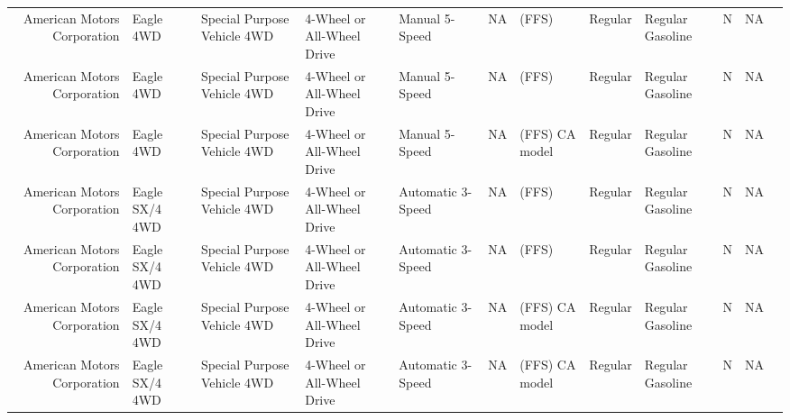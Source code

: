 \documentclass[11pt]{article}
\begin{document}
\begin{tabular}{r|lllllllllll}
	 American Motors Corporation & Eagle 4WD                   & Special Purpose Vehicle 4WD & 4-Wheel or All-Wheel Drive  & Manual 5-Speed              & NA                          & (FFS)                       & Regular                     & Regular Gasoline            & N                           & NA                         \\
	 American Motors Corporation & Eagle 4WD                   & Special Purpose Vehicle 4WD & 4-Wheel or All-Wheel Drive  & Manual 5-Speed              & NA                          & (FFS)                       & Regular                     & Regular Gasoline            & N                           & NA                         \\
	 American Motors Corporation & Eagle 4WD                   & Special Purpose Vehicle 4WD & 4-Wheel or All-Wheel Drive  & Manual 5-Speed              & NA                          & (FFS) CA model              & Regular                     & Regular Gasoline            & N                           & NA                         \\
	 American Motors Corporation & Eagle SX/4 4WD              & Special Purpose Vehicle 4WD & 4-Wheel or All-Wheel Drive  & Automatic 3-Speed           & NA                          & (FFS)                       & Regular                     & Regular Gasoline            & N                           & NA                         \\
	 American Motors Corporation & Eagle SX/4 4WD              & Special Purpose Vehicle 4WD & 4-Wheel or All-Wheel Drive  & Automatic 3-Speed           & NA                          & (FFS)                       & Regular                     & Regular Gasoline            & N                           & NA                         \\
	 American Motors Corporation & Eagle SX/4 4WD              & Special Purpose Vehicle 4WD & 4-Wheel or All-Wheel Drive  & Automatic 3-Speed           & NA                          & (FFS) CA model              & Regular                     & Regular Gasoline            & N                           & NA                         \\
	 American Motors Corporation & Eagle SX/4 4WD              & Special Purpose Vehicle 4WD & 4-Wheel or All-Wheel Drive  & Automatic 3-Speed           & NA                          & (FFS) CA model              & Regular                     & Regular Gasoline            & N                           & NA                         \\

\end{tabular}
\end{document}
